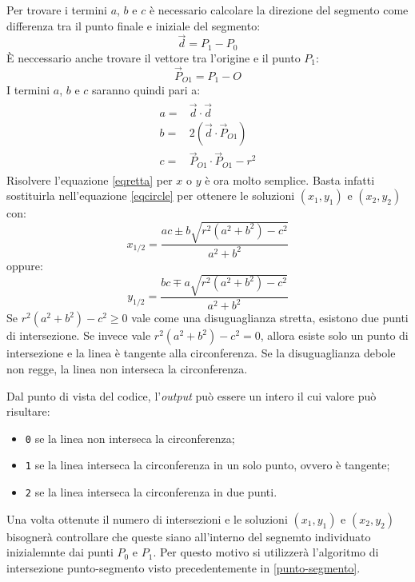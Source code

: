 Per trovare i termini $a$, $b$ e $c$ è necessario calcolare la direzione del segmento come differenza tra il punto finale e iniziale del segmento:
\begin{equation}
\vec{d} = P_1 - P_0 
\end{equation}
È neccessario anche trovare il vettore tra l'origine e il punto $P_1$:
\begin{equation}
\vec{P}_{O1} = P_1 - O
\end{equation}
I termini $a$, $b$ e $c$ saranno quindi pari a:
\begin{equation}
\begin{aligned}
	\begin{split}
		a =& \vec{d} \cdot \vec{d} \\
		b =& 2 (\vec{d} \cdot \vec{P}_{O1}) \\
		c =& \vec{P}_{O1} \cdot \vec{P}_{O1} - r^2
	\end{split}
\end{aligned}
\end{equation}
Risolvere l'equazione \ref{eqretta} per $x$ o $y$ è ora molto semplice. Basta infatti sostituirla nell'equazione \ref{eqcircle} per ottenere le soluzioni $(x_1, y_1)$ e $(x_2, y_2)$ con:
\begin{equation}
x_{1/2} = \frac{ac \pm b \sqrt{r^2 (a^2 + b^2)-c^2}}{a ^ 2 + b ^ 2}
\end{equation}
oppure:
\begin{equation}
y_{1/2} = \frac{bc \mp a \sqrt{r^2 (a^2 + b^2)-c^2}}{a ^ 2 + b ^ 2}
\end{equation}
Se $r^2 (a^2 + b^2)-c^2 \geq 0$ vale come una disuguaglianza stretta, esistono due punti di intersezione. Se invece vale $r^2 (a^2 + b^2)-c^2 = 0$, allora esiste solo un punto di intersezione e la linea è tangente alla circonferenza. Se la disuguaglianza debole non regge, la linea non interseca la circonferenza.

Dal punto di vista del codice, l'\textit{output} può essere un intero il cui valore può risultare:
\begin{itemize}
	\item \texttt{0} se la linea non interseca la circonferenza;
	\item \texttt{1} se la linea interseca la circonferenza in un solo punto, ovvero è tangente;
	\item \texttt{2} se la linea interseca la circonferenza in due punti.
\end{itemize}

Una volta ottenute il numero di intersezioni e le soluzioni $(x_1, y_1)$ e $(x_2, y_2)$ bisognerà controllare che queste siano all'interno del segnemto individuato inizialemnte dai punti $P_0$ e $P_1$. Per questo motivo si utilizzerà l'algoritmo di intersezione punto-segmento visto precedentemente in \ref{punto-segmento}.

